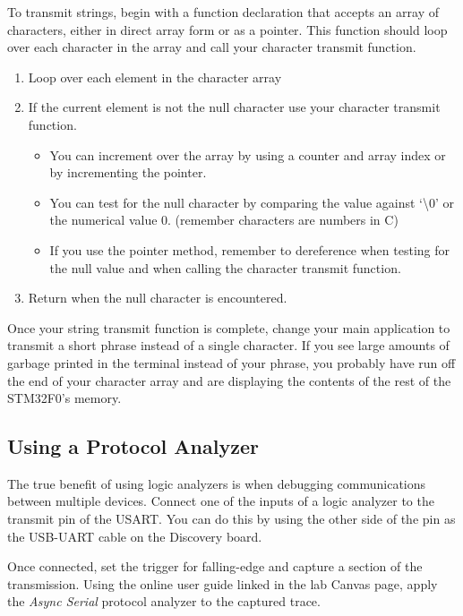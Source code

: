 \documentclass[11pt,fleqn]{book} %
\begin{document}
To transmit strings, begin with a function declaration that accepts an array of characters, either in direct array form or as a pointer. This function should loop over each character in the array and call your character transmit function. 

\begin{enumerate}
    \item Loop over each element in the character array
    \item If the current element is not the null character use your character transmit function.
    \begin{itemize}
        \item You can increment over the array by using a counter and array index or by incrementing the pointer.
        \item You can test for the null character by comparing the value against `{\textbackslash}0' or the numerical value 0. (remember characters are numbers in C) 
        \item If you use the pointer method, remember to dereference when testing for the null value and when calling the character transmit function.
    \end{itemize} 
    \item Return when the null character is encountered. 
\end{enumerate}

Once your string transmit function is complete, change your main application to transmit a short phrase instead of a single character. If you see large amounts of garbage printed in the terminal instead of your phrase, you probably have run off the end of your character array and are displaying the contents of the rest of the STM32F0's memory. 

\subsection{Using a Protocol Analyzer}
The true benefit of using logic analyzers is when debugging communications between multiple devices. Connect one of the inputs of a logic analyzer to the transmit pin of the USART. You can do this by using the other side of the pin as the USB-UART cable on the Discovery board.

Once connected, set the trigger for falling-edge and capture a section of the transmission. Using the online user guide linked in the lab Canvas page, apply the \textit{Async Serial} protocol analyzer to the captured trace. 
\end{document}
